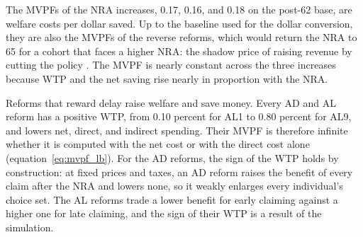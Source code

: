 The MVPFs of the NRA increases, 0.17, 0.16, and 0.18 on the post-62 base, are welfare costs per dollar saved. Up to the baseline used for the dollar conversion, they are also the MVPFs of the reverse reforms, which would return the NRA to 65 for a cohort that faces a higher NRA: the shadow price of raising revenue by cutting the policy \citep{hendren2020unified}. The MVPF is nearly constant across the three increases because WTP and the net saving rise nearly in proportion with the NRA.

Reforms that reward delay raise welfare and save money. Every AD and AL reform has a positive WTP, from 0.10 percent for AL1 to 0.80 percent for AL9, and lowers net, direct, and indirect spending. Their MVPF is therefore infinite whether it is computed with the net cost or with the direct cost alone (equation~\eqref{eq:mvpf_lb}). For the AD reforms, the sign of the WTP holds by construction: at fixed prices and taxes, an AD reform raises the benefit of every claim after the NRA and lowers none, so it weakly enlarges every individual's choice set. The AL reforms trade a lower benefit for early claiming against a higher one for late claiming, and the sign of their WTP is a result of the simulation.


